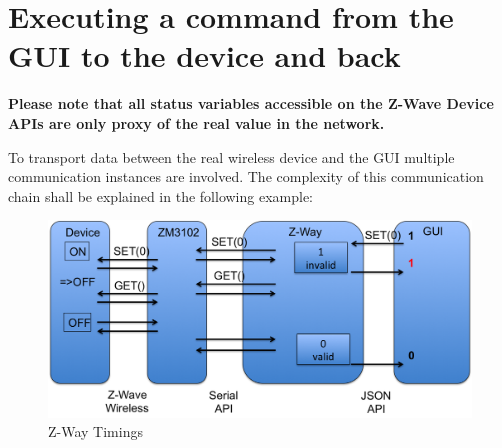 \section{Executing a command from the GUI to the device and back}

\textbf{Please note that all status variables accessible on the Z-Wave Device APIs
are only proxy of the real value in the network.}

To transport data between the real wireless device and the GUI multiple communication 
instances are involved. The complexity of this communication chain shall be 
explained in the following example:

\begin{figure} 
\begin{center}
\includegraphics[scale=0.6]{pics/zway2en.png}
\caption{Z-Way Timings}
\label{zwaytimings} 
\end{center} 
\end{figure}

